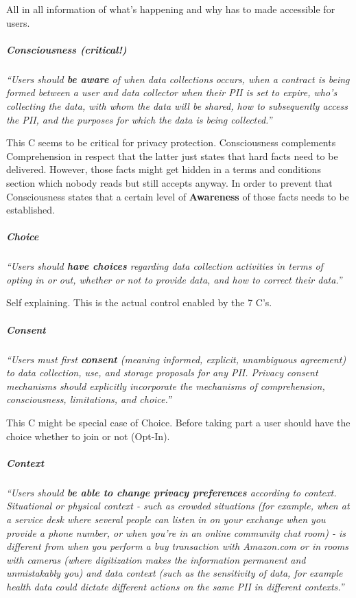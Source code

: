 All in all information of what's happening and why has to made
accessible for users.

\subparagraph{Consciousness \textbf{(critical!)}}

\emph{``Users should \textbf{be aware} of when data collections occurs,
when a contract is being formed between a user and data collector when
their PII is set to expire, who's collecting the data, with whom the
data will be shared, how to subsequently access the PII, and the
purposes for which the data is being collected.''}

This C seems to be critical for privacy protection. Consciousness
complements Comprehension in respect that the latter just states that
hard facts need to be delivered. However, those facts might get hidden
in a terms and conditions section which nobody reads but still accepts
anyway. In order to prevent that Consciousness states that a certain
level of \textbf{Awareness} of those facts needs to be established.

\subparagraph{Choice}

\emph{``Users should \textbf{have choices} regarding data collection
activities in terms of opting in or out, whether or not to provide data,
and how to correct their data.''}

Self explaining. This is the actual control enabled by the 7 C's.

\subparagraph{Consent}

\emph{``Users must first \textbf{consent} (meaning informed, explicit,
unambiguous agreement) to data collection, use, and storage proposals
for any PII. Privacy consent mechanisms should explicitly incorporate
the mechanisms of comprehension, consciousness, limitations, and
choice.''}

This C might be special case of Choice. Before taking part a user should
have the choice whether to join or not (Opt-In).

\subparagraph{Context}

\emph{``Users should \textbf{be able to change privacy preferences}
according to context. Situational or physical context - such as crowded
situations (for example, when at a service desk where several people
can listen in on your exchange when you provide a phone number, or when
you're in an online community chat room) - is different from when you
perform a buy transaction with Amazon.com or in rooms with cameras
(where digitization makes the information permanent and unmistakably
you) and data context (such as the sensitivity of data, for example
health data could dictate different actions on the same PII in different
contexts.''}


